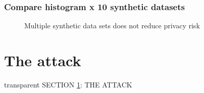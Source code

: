 \documentclass[t,8pt,utfx8]{beamer}
\begin{document}
\begin{spacing}{1.25}
\begin{frame}[t]\frametitle{Compare histogram x 10 synthetic datasets}

\begin{figure}
    \caption{Multiple synthetic data sets does not reduce privacy risk}
    \label{fig:cart_histogram_compare_10}
\end{figure}

\end{frame}


\section{The attack}\label{sec:attack}
\begin{frame}[c,plain]
\vskip-4mm
\begin{beamercolorbox}[wd=\boxwidth,ht=22.11mm]{transparent}%
    \vfill%
    \leftinsert%
    \MakeUppercase{Section \ref{sec:attack}: The attack
} %
\end{beamercolorbox}
\vskip-3mm


\end{frame}
\end{spacing}
\end{document}
